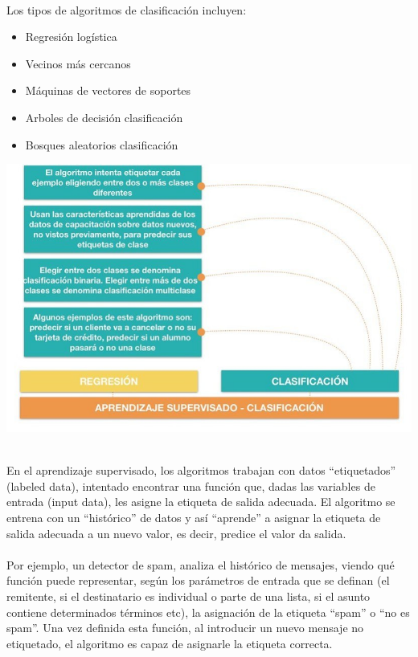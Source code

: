 \documentclass[11pt,a4paper]{article}
\begin{document}
\begin{enumerate}[A.]
                \\Los tipos de algoritmos de clasificación incluyen:\\

                \begin{itemize}
			    \item Regresión logística
			    \item Vecinos más cercanos
			    \item Máquinas de vectores de soportes
			    \item Arboles de decisión clasificación
			    \item Bosques aleatorios clasificación
		        \end{itemize}
                
                \begin{center}
		        \includegraphics[scale=1.0]{./Imagenes/AprendSuperClasificacion}
		        \end{center}
			
			\end{enumerate}
			
		    \\En el aprendizaje supervisado, los algoritmos trabajan con datos “etiquetados” (labeled data), intentado encontrar una función que, dadas las variables de entrada (input data), les asigne la etiqueta de salida adecuada. El algoritmo se entrena con un “histórico” de datos y así “aprende” a asignar la etiqueta de salida adecuada a un nuevo valor, es decir, predice el valor da salida.\\

            \\Por ejemplo, un detector de spam, analiza el histórico de mensajes, viendo qué función puede representar, según los parámetros de entrada que se definan (el remitente, si el destinatario es individual o parte de una lista, si el asunto contiene determinados términos etc), la asignación de la etiqueta “spam” o “no es spam”. Una vez definida esta función, al introducir un nuevo mensaje no etiquetado, el algoritmo es capaz de asignarle la etiqueta correcta.\\
\end{document}
